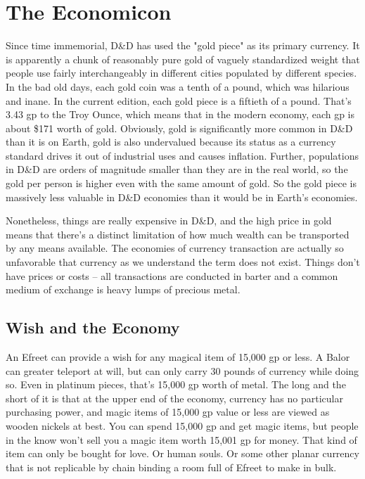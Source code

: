 
\section{The Economicon} %
\vspace*{-10pt}

Since time immemorial, D\&D has used the "gold piece" as its primary currency. It is apparently a chunk of reasonably pure gold of vaguely standardized weight that people use fairly interchangeably in different cities populated by different species. In the bad old days, each gold coin was a tenth of a pound, which was hilarious and inane. In the current edition, each gold piece is a fiftieth of a pound. That's 3.43 gp to the Troy Ounce, which means that in the modern economy, each gp is about \$171 worth of gold. Obviously, gold is significantly more common in D\&D than it is on Earth, gold is also undervalued because its status as a currency standard drives it out of industrial uses and causes inflation. Further, populations in D\&D are orders of magnitude smaller than they are in the real world, so the gold per person is higher even with the same amount of gold. So the gold piece is massively less valuable in D\&D economies than it would be in Earth's economies.

Nonetheless, things are really expensive in D\&D, and the high price in gold means that there's a distinct limitation of how much wealth can be transported by any means available. The economies of currency transaction are actually so unfavorable that currency as we understand the term does not exist. Things don't have prices or costs -- all transactions are conducted in barter and a common medium of exchange is heavy lumps of precious metal.

\subsection{Wish and the Economy}

An Efreet can provide a wish for any magical item of 15,000 gp or less. A Balor can greater teleport at will, but can only carry 30 pounds of currency while doing so. Even in platinum pieces, that's 15,000 gp worth of metal. The long and the short of it is that at the upper end of the economy, currency has no particular purchasing power, and magic items of 15,000 gp value or less are viewed as wooden nickels at best. You can spend 15,000 gp and get magic items, but people in the know won't sell you a magic item worth 15,001 gp for money. That kind of item can only be bought for love. Or human souls. Or some other planar currency that is not replicable by chain binding a room full of Efreet to make in bulk.

